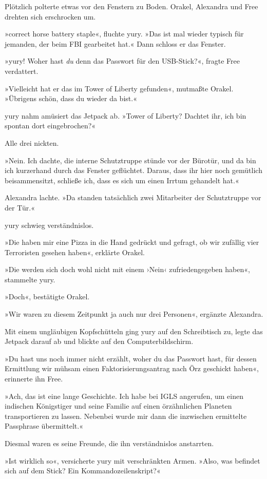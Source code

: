 Plötzlich polterte etwas vor den Fenstern zu Boden. Orakel, Alexandra und Free drehten sich erschrocken um.

»correct horse battery staple«, fluchte yury. »Das ist mal wieder typisch für jemanden, der beim FBI gearbeitet hat.« Dann schloss er das Fenster.

»yury! Woher hast \emph{du} denn das Passwort für den USB-Stick?«, fragte Free verdattert.

»Vielleicht hat er das im Tower of Liberty gefunden«, mutmaßte Orakel. »Übrigens schön, dass du wieder da bist.«

yury nahm amüsiert das Jetpack ab. »Tower of Liberty? Dachtet ihr, ich bin spontan dort eingebrochen?«

Alle drei nickten.

»Nein. Ich dachte, die interne Schutztruppe stünde vor der Bürotür, und da bin ich kurzerhand durch das Fenster geflüchtet. Daraus, dass ihr hier noch gemütlich beisammensitzt, schließe ich, dass es sich um einen Irrtum gehandelt hat.«

Alexandra lachte. »Da standen tatsächlich zwei Mitarbeiter der Schutztruppe vor der Tür.«

yury schwieg verständnislos.

»Die haben mir eine Pizza in die Hand gedrückt und gefragt, ob wir zufällig vier Terroristen gesehen haben«, erklärte Orakel.

»Die werden sich doch wohl nicht mit einem ›Nein‹ zufriedengegeben haben«, stammelte yury.

»Doch«, bestätigte Orakel.

»Wir waren zu diesem Zeitpunkt ja auch nur drei Personen«, ergänzte Alexandra.

Mit einem ungläubigen Kopfschütteln ging yury auf den Schreibtisch zu, legte das Jetpack darauf ab und blickte auf den Computerbildschirm.

»Du hast uns noch immer nicht erzählt, woher du das Passwort hast, für dessen Ermittlung wir mühsam einen Faktorisierungsantrag nach Örz geschickt haben«, erinnerte ihn Free.

»Ach, das ist eine lange Geschichte. Ich habe bei IGLS angerufen, um einen indischen Königstiger und seine Familie auf einen örzähnlichen Planeten transportieren zu lassen. Nebenbei wurde mir dann die inzwischen ermittelte Passphrase übermittelt.«

Diesmal waren es seine Freunde, die ihn verständnislos anstarrten.

»Ist wirklich so«, versicherte yury mit verschränkten Armen. »Also, was befindet sich auf dem Stick? Ein Kommandozeilenskript?«

